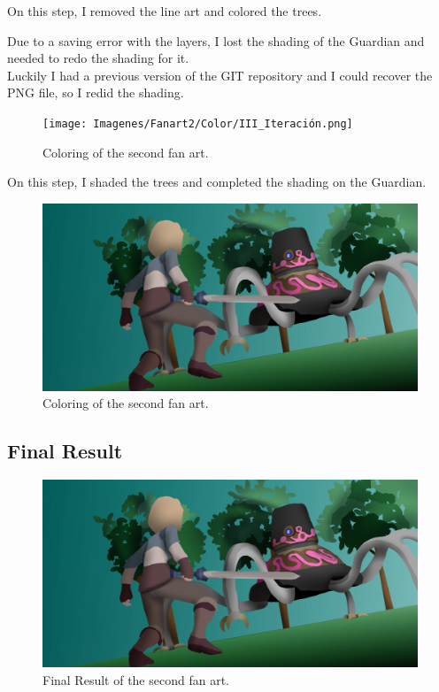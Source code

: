 \documentclass{cup-pan}
\begin{document}
        On this step, I removed the line art and colored the trees.

        Due to a saving error with the layers, I lost the shading of the Guardian and needed to redo the shading for it.\\

        Luckily I had a previous version of the GIT repository and I could recover the PNG file, so I redid the shading.\\
        \begin{figure}[H]
            \texttt{[image: Imagenes/Fanart2/Color/III\_Iteración.png]}
            \caption{Coloring of the second fan art.}
        \end{figure}

        On this step, I shaded the trees and completed the shading on the Guardian.\\
        \begin{figure}[H]
            \includegraphics[width=\textwidth]{Imagenes/Fanart2/Color/IIII_Iteracion.png}
            \caption{Coloring of the second fan art.}
        \end{figure}

    \subsection{Final Result}

        \begin{figure}[H]
            \includegraphics[width=\textwidth]{Imagenes/Fanart2/Color/IIII_Iteracion.png}
            \caption{Final Result of the second fan art.}
        \end{figure}
\end{document}
